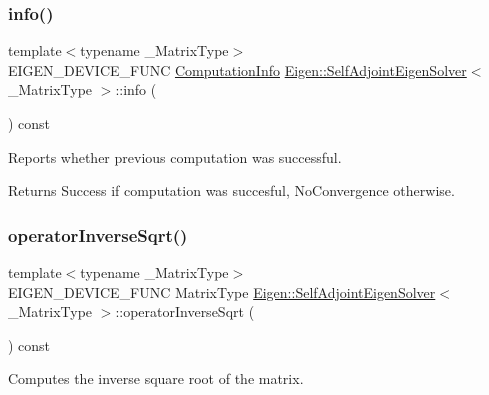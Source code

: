 \subsubsection{\texorpdfstring{info()}{info()}}
{\footnotesize\ttfamily template$<$typename \+\_\+\+Matrix\+Type$>$ \\
E\+I\+G\+E\+N\+\_\+\+D\+E\+V\+I\+C\+E\+\_\+\+F\+U\+NC \mbox{\hyperlink{group__enums_ga85fad7b87587764e5cf6b513a9e0ee5e}{Computation\+Info}} \mbox{\hyperlink{class_eigen_1_1_self_adjoint_eigen_solver}{Eigen\+::\+Self\+Adjoint\+Eigen\+Solver}}$<$ \+\_\+\+Matrix\+Type $>$\+::info (\begin{DoxyParamCaption}{ }\end{DoxyParamCaption}) const\hspace{0.3cm}{\ttfamily [inline]}}



Reports whether previous computation was successful. 

\begin{DoxyReturn}{Returns}
{\ttfamily Success} if computation was succesful, {\ttfamily No\+Convergence} otherwise. 
\end{DoxyReturn}
\mbox{\label{class_eigen_1_1_self_adjoint_eigen_solver_a71fe0aea0b22d176efcea556c5c160f5}} 
\subsubsection{\texorpdfstring{operatorInverseSqrt()}{operatorInverseSqrt()}}
{\footnotesize\ttfamily template$<$typename \+\_\+\+Matrix\+Type$>$ \\
E\+I\+G\+E\+N\+\_\+\+D\+E\+V\+I\+C\+E\+\_\+\+F\+U\+NC Matrix\+Type \mbox{\hyperlink{class_eigen_1_1_self_adjoint_eigen_solver}{Eigen\+::\+Self\+Adjoint\+Eigen\+Solver}}$<$ \+\_\+\+Matrix\+Type $>$\+::operator\+Inverse\+Sqrt (\begin{DoxyParamCaption}{ }\end{DoxyParamCaption}) const\hspace{0.3cm}{\ttfamily [inline]}}



Computes the inverse square root of the matrix. 

